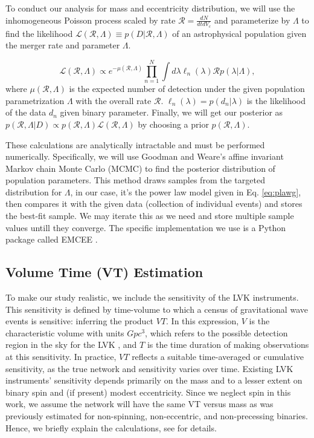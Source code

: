 \documentclass[twocolumn,prd,nofootinbib]{revtex4}
\begin{document}
To conduct our analysis for mass and eccentricity distribution, we will use the inhomogeneous Poisson process scaled by rate $\mathcal{R} = \frac{dN}{dtdV_c}$ and parameterize by $\Lambda$ to find the likelihood  $\mathcal{L}(\mathcal{R},\Lambda)\equiv p(D|\mathcal{R},\Lambda)$ of an astrophysical population given the merger rate and parameter $\Lambda$. 

\begin{equation}
\label{eq: likelihood}
\mathcal{L}(\mathcal{R},\Lambda) \propto e^{-\mu(\mathcal{R},\Lambda)}\prod_{n=1}^N\int d\lambda \ell_n(\lambda) \mathcal{R} p(\lambda|\Lambda),
\end{equation}
%
where $\mu(\mathcal{R},\Lambda)$ is the expected number of detection under the given population parametrization $\Lambda$ with the overall rate $\mathcal{R}$. $\ell_n(\lambda)=p(d_n|\lambda)$ is the likelihood of the data $d_n$ given binary parameter.
Finally, we will get our posterior as $p(\mathcal{R},\Lambda | D)\propto p(\mathcal{R},\Lambda)  \mathcal{L}(\mathcal{R},\Lambda)$ by choosing a prior $p(\mathcal{R},\Lambda)$.

These calculations are analytically intractable and must be performed numerically. Specifically, we will use Goodman and Weare's affine invariant Markov chain Monte Carlo (MCMC) \cite{mcmc_paper} to find the posterior distribution of population parameters. This method draws samples from the targeted distribution for $\Lambda$, in our case, it's the power law model given in Eq. \ref{eq:plawg}, then compares it with the given data (collection of individual events) and stores the best-fit sample. We may iterate this as we need and store multiple sample values untill they converge. 
The specific implementation we use is a Python package called EMCEE \cite{emcee_paper}.


\subsection{Volume Time (VT) Estimation}

To make our study realistic, we include the sensitivity of the LVK instruments. This sensitivity is defined by time-volume to which a census of gravitational wave events is sensitive: inferring the product $VT$.  In this expression, $V$ is the characteristic volume with units $Gpc^{3}$, which refers to the possible detection region in the sky for the LVK \cite{Volume_1993}, and $T$ is the time duration of making observations at this sensitivity.  In practice, $VT$ reflects a suitable time-averaged or cumulative sensitivity, as the true network and sensitivity varies over time.
Existing LVK instruments' sensitivity depends primarily on the mass and to a lesser extent on binary spin and (if present) modest eccentricity.  Since we neglect spin in this work, we assume the network will have the same  VT versus mass as was previously estimated  \cite{Dan_2019} for non-spinning, non-eccentric, and non-precessing binaries. Hence, we briefly explain the calculations, see \cite{Dan_2019} for details.
\end{document}
